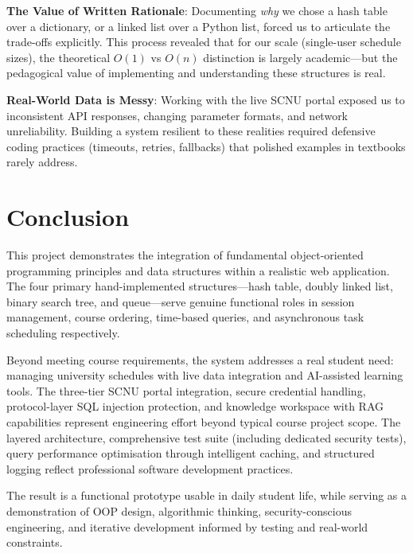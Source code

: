 \documentclass[11pt,a4paper]{article}
\begin{document}
\textbf{The Value of Written Rationale}: Documenting \textit{why} we chose a hash table over a dictionary, or a linked list over a Python list, forced us to articulate the trade-offs explicitly. This process revealed that for our scale (single-user schedule sizes), the theoretical $O(1)$ vs $O(n)$ distinction is largely academic---but the pedagogical value of implementing and understanding these structures is real.

\textbf{Real-World Data is Messy}: Working with the live SCNU portal exposed us to inconsistent API responses, changing parameter formats, and network unreliability. Building a system resilient to these realities required defensive coding practices (timeouts, retries, fallbacks) that polished examples in textbooks rarely address.

\section{Conclusion}
This project demonstrates the integration of fundamental object-oriented programming principles and data structures within a realistic web application. The four primary hand-implemented structures---hash table, doubly linked list, binary search tree, and queue---serve genuine functional roles in session management, course ordering, time-based queries, and asynchronous task scheduling respectively.

Beyond meeting course requirements, the system addresses a real student need: managing university schedules with live data integration and AI-assisted learning tools. The three-tier SCNU portal integration, secure credential handling, protocol-layer SQL injection protection, and knowledge workspace with RAG capabilities represent engineering effort beyond typical course project scope. The layered architecture, comprehensive test suite (including dedicated security tests), query performance optimisation through intelligent caching, and structured logging reflect professional software development practices.

The result is a functional prototype usable in daily student life, while serving as a demonstration of OOP design, algorithmic thinking, security-conscious engineering, and iterative development informed by testing and real-world constraints.
\end{document}
